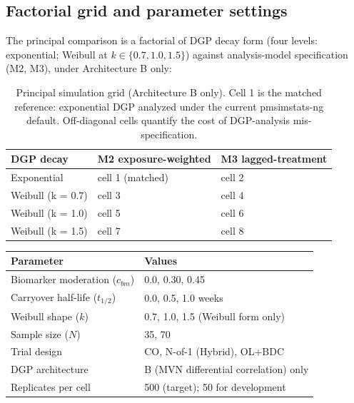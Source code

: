 \documentclass[
  11pt,
]{article}
\newcounter{none} %
\begin{document}
\subsection{Factorial grid and parameter settings}\label{factorial-grid-and-parameter-settings}

The principal comparison is a factorial of DGP decay form (four
levels: exponential; Weibull at \(k \in \{0.7, 1.0, 1.5\}\)) against
analysis-model specification (M2, M3), under Architecture B only:

\begin{table}

\caption{\label{tab:grid-table}Principal simulation grid (Architecture B only). Cell 1
    is the matched reference: exponential DGP analyzed under the
    current pmsimstats-ng default. Off-diagonal cells quantify the
    cost of DGP-analysis mis-specification.}
\centering
\begin{tabular}[t]{l|l|l}
\hline
DGP decay & M2 exposure-weighted & M3 lagged-treatment\\
\hline
Exponential & cell 1 (matched) & cell 2\\
\hline
Weibull (k = 0.7) & cell 3 & cell 4\\
\hline
Weibull (k = 1.0) & cell 5 & cell 6\\
\hline
Weibull (k = 1.5) & cell 7 & cell 8\\
\hline
\end{tabular}
\end{table}

{\def\LTcaptype{none} %
\begin{longtable}[]{@{}ll@{}}
\toprule\noalign{}
Parameter & Values \\
\midrule\noalign{}
\endhead
\bottomrule\noalign{}
\endlastfoot
Biomarker moderation (\(c_{bm}\)) & 0.0, 0.30, 0.45 \\
Carryover half-life (\(t_{1/2}\)) & 0.0, 0.5, 1.0 weeks \\
Weibull shape (\(k\)) & 0.7, 1.0, 1.5 (Weibull form only) \\
Sample size (\(N\)) & 35, 70 \\
Trial design & CO, N-of-1 (Hybrid), OL+BDC \\
DGP architecture & B (MVN differential correlation) only \\
Replicates per cell & 500 (target); 50 for development \\
\end{longtable}
}
\end{document}
